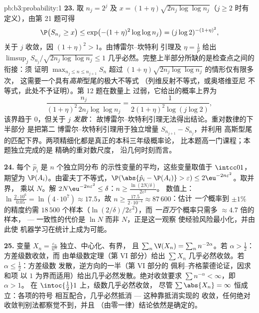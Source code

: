 \begin{solution}{pb:b3:probability:1}
\textbf{23.} 取 $n_j = 2^j$ 及 $x = (1 +
\eta)\sqrt{2n_j\log\log n_j}$（$j \geq 2$ 时有定义），由第
21 题可得
\[
\P\bigl(S_{n_j} \geq x\bigr) \leq \exp\bigl(-(1 +
\eta)^2\log\log n_j\bigr) = (j\log 2)^{-(1+\eta)^2},
\]
关于 $j$ 收敛，因 $(1 + \eta)^2 > 1$。由博雷尔–坎特利
引理及 $\eta = \frac1p$ 给出 $\limsup_jS_{n_j}/\sqrt{2n_j
\log\log n_j} \leq 1$ 几乎必然。完整上半部分所缺的是检查点之间的
衔接：须
证明 $\max_{n_j\leq n\leq n_{j+1}}S_n$ 超过
$(1+\eta)\sqrt{2n_j\log\log n_j}$ 的情形仅有限多次，
这需要一个具有\emph{高斯}型尾的极大不等式
（列维反射不等式，或奥塔维亚尼
不等式，此处不予证明）。第 12 题在数量上
过弱，它给出的概率上界为
\[
\frac{n_j}{(1+\eta)^2\,2n_j\log\log n_j}
= \frac{1}{2(1+\eta)^2\log(j\log2)},
\]
该界趋于 $0$，但关于 $j$ \emph{发散}：
故博雷尔–坎特利引理无法得出结论。重对数律的下半部分
是把第二
博雷尔–坎特利引理用于独立增量
$S_{n_{j+1}} - S_{n_j}$，并利用
高斯型尾的匹配下界。两项精细化都是真正的本科三年级概率论，
比本题高一门课程；本题独立完成的是
精确的重对数尺度，
沿几何时刻而言。

\textbf{24.} 每个 $\hat p_i$ 是 $n$ 个独立同分布
的示性变量的平均，这些变量取值于 $\intcc01$，期望为
$\P(A_i)$。由霍夫丁不等式，$\P(\abs{\hat p_i - \P(A_i)} >
\varepsilon) \leq 2\eu^{-2n\varepsilon^2}$。取并界，
乘以 $N$。解 $2N\eu^{-2n\varepsilon^2} \leq
\delta$：$n \geq \frac{\ln(2N/\delta)}{2\varepsilon^2}$。
数值上：$\ln\frac{2\cdot10^6}{0.05} =
\ln(4\cdot10^7) \approx 17.5$，故 $n \geq
\frac{17.5}{2\cdot10^{-4}} \approx 87\,600$：估计
\emph{一个}概率到 $\pm1\%$ 的精度约需 $18\,500$
个样本（$\ln(2/\delta)/2\varepsilon^2$），而
\emph{一百万}个概率只需多 $\approx 4.7$ 倍的样本，
--- 一致性的代价是 $\ln N$ 而非 $N$，正是这一观察
使经验风险最小化，并由此使
机器学习在统计上成为可能。

\textbf{25.} 变量 $X_n = \frac{\varepsilon_n}
{n^\alpha}$ 独立、中心化、有界，
且 $\sum_n\V(X_n) = \sum_nn^{-2\alpha}$。若 $\alpha >
\frac12$：方差级数收敛，而
由单级数定理（第 VI 部分）给出
$\sum X_n$ 几乎必然收敛。若 $\alpha \leq \frac12$：方差级数
发散，逆方向的一半（第 VI 部分的
佩利–齐格蒙德论证，因求和项
以 $1$ 为界而适用）给出几乎必然发散。绝对收敛要求
$\sum n^{-\alpha} < \infty$，即 $\alpha > 1$。
在 $\intoc{\frac12}1$ 上，级数几乎必然收敛，
尽管 $\sum\abs{X_n} = \infty$ 恒成立：各项的符号
相互配合，几乎必然抵消 --- 这种靠抵消实现的
收敛，任何绝对收敛判别法都察觉不到，并且
（由零一律）结论依然是确定的。
\end{solution}
